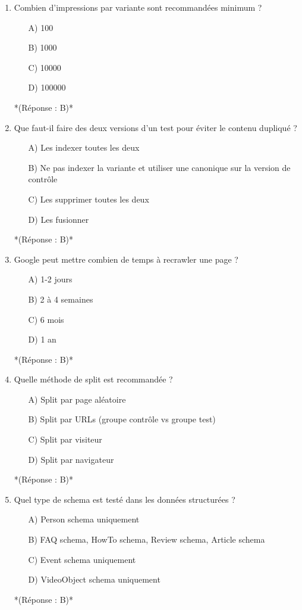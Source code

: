 \documentclass[12pt,a4paper,twoside]{report}
\begin{document}
\begin{enumerate}
    \item Combien d'impressions par variante sont recommandées minimum ?
    \begin{itemize}
        \item[A)] 100
        \item[B)] 1000
        \item[C)] 10000
        \item[D)] 100000
    \end{itemize}
    *(Réponse : B)*

    \item Que faut-il faire des deux versions d'un test pour éviter le contenu dupliqué ?
    \begin{itemize}
        \item[A)] Les indexer toutes les deux
        \item[B)] Ne pas indexer la variante et utiliser une canonique sur la version de contrôle
        \item[C)] Les supprimer toutes les deux
        \item[D)] Les fusionner
    \end{itemize}
    *(Réponse : B)*

    \item Google peut mettre combien de temps à recrawler une page ?
    \begin{itemize}
        \item[A)] 1-2 jours
        \item[B)] 2 à 4 semaines
        \item[C)] 6 mois
        \item[D)] 1 an
    \end{itemize}
    *(Réponse : B)*

    \item Quelle méthode de split est recommandée ?
    \begin{itemize}
        \item[A)] Split par page aléatoire
        \item[B)] Split par URLs (groupe contrôle vs groupe test)
        \item[C)] Split par visiteur
        \item[D)] Split par navigateur
    \end{itemize}
    *(Réponse : B)*

    \item Quel type de schema est testé dans les données structurées ?
    \begin{itemize}
        \item[A)] Person schema uniquement
        \item[B)] FAQ schema, HowTo schema, Review schema, Article schema
        \item[C)] Event schema uniquement
        \item[D)] VideoObject schema uniquement
    \end{itemize}
    *(Réponse : B)*


\end{enumerate}
\end{document}
